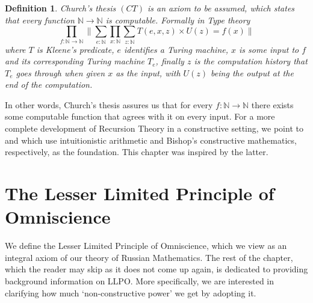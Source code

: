 \documentclass[12pt]{report}
\newtheorem{defn}[thm]{Definition}
\theoremstyle{definition}
\begin{document}
\begin{defn}\label{CT}
Church's thesis $(CT)$ is an axiom to be assumed, which states that every function $\mathbb{N}\rightarrow \mathbb{N}$ is computable. 
Formally in Type theory
$$\prod_{f : \mathbb{N}\rightarrow \mathbb{N}} \Big\lVert \sum_{e : \mathbb{N}} \prod_{x : \mathbb{N}} \sum_{z : \mathbb{N}} T(e,x,z) \times U(z) = f(x) \Big\rVert$$
where $T$ is Kleene's predicate, $e$ identifies a Turing machine, $x$ is some input to $f$ and its corresponding Turing machine $T_e$, finally $z$ is the computation history that $T_e$ goes through when given $x$ as the input, with $U(z)$ being the output at the end of the computation.
\end{defn}

In other words, Church's thesis assures us that for every $f : \mathbb{N} \rightarrow \mathbb{N}$ there exists some computable function that agrees with it on every input.
For a more complete development of Recursion Theory in a constructive setting, we point to \cite{recursionInHA} and \cite{bridges_richman_1987_1} which use intuitionistic arithmetic and Bishop's constructive mathematics, respectively, as the foundation. 
This chapter was inspired by the latter. 

\chapter{The Lesser Limited Principle of Omniscience}
We define the Lesser Limited Principle of Omniscience, which we view as an integral axiom of our theory of Russian Mathematics. 
The rest of the chapter, which the reader may skip as it does not come up again, is dedicated to providing background information on LLPO. 
More specifically, we are interested in clarifying how much `non-constructive power' we get by adopting it. 
\end{document}
